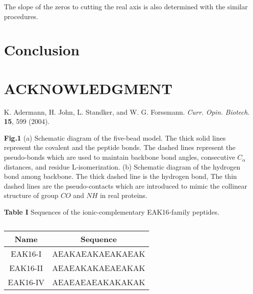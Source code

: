 \documentclass[preprint,preprintnumbers,amsmath,amssymb,showpacs,aps,pre]{revtex4-1}
\begin{document}
The slope of the zeros to cutting the real axis is also determined
with the similar procedures.

\section{Conclusion}

\section*{ACKNOWLEDGMENT}

\begin{thebibliography}{10}

K. Adermann, H. John, L. Standker, and W. G. Forssmann.
{\it Curr. Opin. Biotech.} {\bf 15}, 599 (2004).

\end{thebibliography}

\newpage
\vspace{0.5cm}
\parindent 0pt {\large {\bf Fig.1}}
(a) Schematic diagram of the five-bead model. The thick solid lines
represent the covalent and the peptide bonds. The dashed lines
represent the pseudo-bonds which are used to maintain backbone bond
angles, consecutive $C_{\alpha}$ distances, and residue
L-isomerization. (b) Schematic diagram of the hydrogen bond among
backbone. The thick dashed line is the hydrogen bond, The thin
dashed lines are the pseudo-contacts which are introduced to mimic
the collinear structure of group $CO$ and $NH$ in real proteins.

\vspace{0.5cm}
\parindent 0pt {\large {\bf Table I}}
Sequences of the ionic-complementary EAK16-family peptides.

\newpage

\begin{table}
  \centering
  \caption{}
  \begin{tabular}[t]{c|c}
    \hline
     Name & Sequence \\
    \hline
     EAK16-I  & AEAKAEAKAEAKAEAK \\
     EAK16-II & AEAEAKAKAEAEAKAK \\
     EAK16-IV & AEAEAEAEAKAKAKAK \\
    \hline
  \end{tabular}
\end{table}

\end{document}
